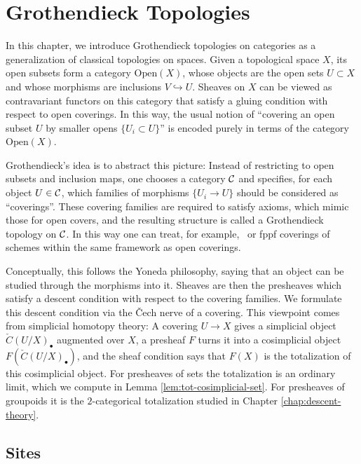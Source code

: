 \chapter{Grothendieck Topologies}\label{chap:grothendieck-topologies}

In this chapter, we introduce Grothendieck topologies on categories as a generalization of classical topologies on spaces. Given a topological space $X$, its open subsets form a category $\mathrm{Open}(X)$, whose objects are the open sets $U\subset X$ and whose morphisms are inclusions $V\hookrightarrow U$. Sheaves on $X$ can be viewed as contravariant functors on this category that satisfy a gluing condition with respect to open coverings. In this way, the usual notion of ``covering an open subset $U$ by smaller opens $\{U_i\subset U\}$'' is encoded purely in terms of the category $\mathrm{Open}(X)$.

Grothendieck's idea is to abstract this picture: Instead of restricting to open subsets and inclusion maps, one chooses a category $\mathcal{C}$ and specifies, for each object $U\in \mathcal{C}$, which families of morphisms $\{U_i \to U\}$ should be considered as ``coverings''. These covering families are required to satisfy axioms, which mimic those for open covers, and the resulting structure is called a Grothendieck topology on $\mathcal{C}$. In this way one can treat, for example, \etale\ or fppf coverings of schemes within the same framework as open coverings.

Conceptually, this follows the Yoneda philosophy, saying that an object can be studied through the morphisms into it. Sheaves are then the presheaves which satisfy a descent condition with respect to the covering families. We formulate this descent condition via the \v{C}ech nerve of a covering. This viewpoint comes from simplicial homotopy theory: A covering $U\to X$ gives a simplicial object $\check{C}(U/X)_\bullet$ augmented over $X$, a presheaf $F$ turns it into a cosimplicial object $F(\check{C}(U/X)_\bullet)$, and the sheaf condition says that $F(X)$ is the totalization of this cosimplicial object. For presheaves of sets the totalization is an ordinary limit, which we compute in Lemma \ref{lem:tot-cosimplicial-set}. For presheaves of groupoids it is the $2$-categorical totalization studied in Chapter \ref{chap:descent-theory}.

\section{Sites}

